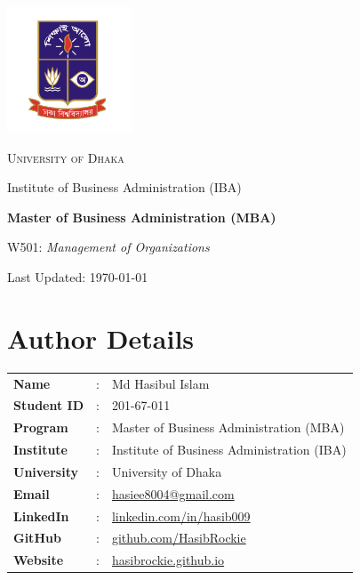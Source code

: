 \documentclass[10pt,a4paper]{book}
\begin{document}
\begin{titlepage}
    \centering
    \vspace*{3.5cm}
    \includegraphics[width=0.28\textwidth]{logo.png}\par\vspace{1.5cm}
    {\scshape\LARGE University of Dhaka\par}
    \vspace{0.5cm}
    {\Large Institute of Business Administration (IBA)\par}
    \vspace{1.5cm}
    {\Huge\bfseries Master of Business Administration (MBA)\par}
    \vspace{1cm}
    {\Large W501: \textit{Management of Organizations}\par}
    \vfill
    {\large Last Updated: \today\par}
\end{titlepage}

\section*{Author Details}
{}

\begin{center}
    \vspace{1em}
    \begin{tabular}{lll}
        \textbf{Name} & : & Md Hasibul Islam \\
        \textbf{Student ID} & : & 201-67-011 \\
        \textbf{Program} & : & Master of Business Administration (MBA) \\
        \textbf{Institute} & : & Institute of Business Administration (IBA) \\
        \textbf{University} & : & University of Dhaka \\
        \textbf{Email} & : & \href{mailto:hasiee8004@gmail.com}{hasiee8004@gmail.com} \\
        \textbf{LinkedIn} & : & \href{https://www.linkedin.com/in/hasib009}{linkedin.com/in/hasib009} \\
        \textbf{GitHub} & : & \href{https://github.com/HasibRockie}{github.com/HasibRockie} \\
        \textbf{Website} & : & \href{https://hasibrockie.github.io}{hasibrockie.github.io} \\
    \end{tabular}
    \vspace{1em}
\end{center}
\end{document}
